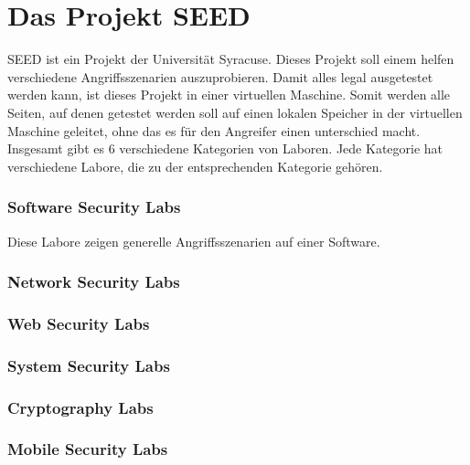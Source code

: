 \section{Das Projekt SEED}
SEED ist ein Projekt der Universität Syracuse. Dieses Projekt soll einem helfen verschiedene Angriffsszenarien auszuprobieren. Damit alles legal ausgetestet werden kann, ist dieses Projekt in einer virtuellen Maschine. Somit werden alle Seiten, auf denen getestet werden soll auf einen lokalen Speicher in der virtuellen Maschine geleitet, ohne das es für den Angreifer einen unterschied macht. \\
Insgesamt gibt es 6 verschiedene Kategorien von Laboren. Jede Kategorie hat verschiedene Labore, die zu der entsprechenden Kategorie gehören.
\subsubsection{Software Security Labs}
Diese Labore zeigen generelle Angriffsszenarien auf einer Software. 
\subsubsection{Network Security Labs}
\subsubsection{Web Security Labs}
\subsubsection{System Security Labs}
\subsubsection{Cryptography Labs}
\subsubsection{Mobile Security Labs}
